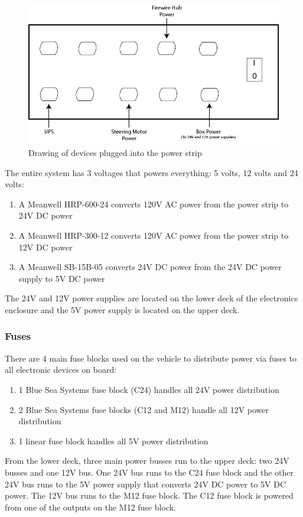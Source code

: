 \begin{figure}[h!]
\centering
\includegraphics[scale=.6]{Photos/PowerStrip_Drawing.jpg}
\caption{Drawing of devices plugged into the power strip}
\label{fig:powerstripdrawing}
\end{figure} 

\noindent The entire system has 3 voltages that powers everything: 5 volts, 12 volts and 24 volts:
\begin{enumerate}
\item A Meanwell HRP-600-24 converts 120V AC power from the power strip to 24V DC power
\item A Meanwell HRP-300-12 converts 120V AC power from the power strip to 12V DC power
\item A Meanwell SB-15B-05 converts 24V DC power from the 24V DC power supply to 5V DC power
\end{enumerate}
%
The 24V and 12V power supplies are located on the lower deck of the electronics enclosure and the 5V power supply is located on the upper deck.

\newpage 

\subsubsection{Fuses}
There are 4 main fuse blocks used on the vehicle to distribute power via fuses to all electronic devices on board:
\begin{enumerate}
\item 1 Blue Sea Systems fuse block (C24) handles all 24V power distribution
\item 2 Blue Sea Systems fuse blocks (C12 and M12) handle all 12V power distribution
\item 1 linear fuse block handles all 5V power distribution 
\end{enumerate}
%
From the lower deck, three main power busses run to the upper deck: two 24V busses and one 12V bus. One 24V bus runs to the C24 fuse block and the other 24V bus runs to the 5V power supply that converts 24V DC power to 5V DC power. The 12V bus runs to the M12 fuse block. The C12 fuse block is powered from one of the outputs on the M12 fuse block.
%
